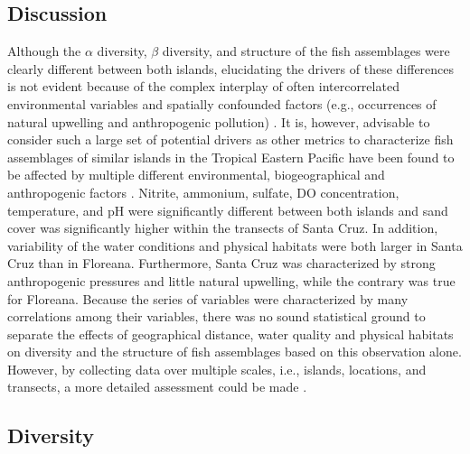\documentclass[jmse,article,accept,moreauthors,pdftex]{Definitions/mdpi}
\begin{document}
\begin{paracol}{2}
\switchcolumn

\renewcommand{\arraystretch}{1}


\FloatBarrier


%
\section{Discussion}
\label{Discussion}

Although the $\alpha$ diversity, $\beta$ diversity, and structure of the fish assemblages were clearly different between both islands, elucidating the drivers of these differences is not evident because of the complex interplay of often intercorrelated environmental variables and spatially confounded factors (e.g., occurrences of natural upwelling and anthropogenic pollution) \citep{Legendre2012NumericalEcology,Robinson2011PushingOpportunities}. It is, however, advisable to consider such a large set of potential drivers as other metrics to characterize fish assemblages of similar islands in the Tropical Eastern Pacific have been found to be affected by multiple different environmental, biogeographical and anthropogenic factors \citep{Luiz2015CommunityVariables,Quimbayo2019DeterminantsIslands,Quimbayo2017UnusualPacific}. Nitrite, ammonium, sulfate, DO concentration, temperature, and pH were significantly different between both islands and sand cover was significantly higher within the transects of Santa Cruz. In addition, variability of the water conditions and physical habitats were both larger in Santa Cruz than in Floreana. Furthermore, Santa Cruz was characterized by strong anthropogenic pressures and little natural upwelling, while the contrary was true for Floreana. Because the series of variables were characterized by many correlations among their variables, there was no sound statistical ground to separate the effects of geographical distance, water quality and physical habitats on diversity and the structure of fish assemblages based on this observation alone. However, by collecting data over multiple scales, i.e., islands, locations, and transects, a more detailed assessment could be made \citep{Yackulic2016}.

\subsection{Diversity}


\end{paracol}
\end{document}
